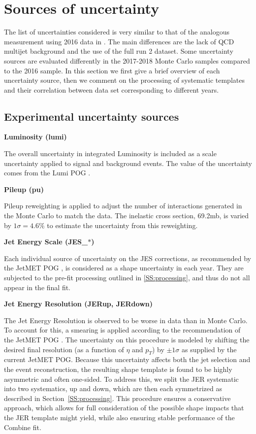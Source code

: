 \clearpage
\section{Sources of uncertainty}

The list of uncertainties considered is very similar to that of the analogous measurement using 2016 data in \cite{ytnote}. The main differences are the lack of QCD multijet background and the  use of the full run 2 dataset. Some uncertainty sources are evaluated differently in the 2017-2018 Monte Carlo samples compared to the 2016 sample. In this section we first give a brief overview of each uncertainty source, then we comment on the processing of systematic templates and their correlation between data set corresponding to different years.

\label{S:sys}
\subsection{Experimental uncertainty sources}
\label{SS:syslist}

\noindent \textbf{Luminosity (lumi)}

The overall uncertainty in integrated Luminosity is included as a scale uncertainty applied to signal and background events. The value of the uncertainty comes from the Lumi POG \cite{LumiTwiki}.

\par \noindent
\textbf{Pileup (pu)}

Pileup reweighting is applied to adjust the number of interactions generated in the Monte Carlo to match the data. The inelastic cross section, 69.2\unit{mb}, is varied by $1\sigma = 4.6\%$ to estimate the uncertainty from this reweighting.

\par \noindent
\textbf{Jet Energy Scale (JES\_$\ast$)}

Each individual source of uncertainty on the JES corrections, as recommended by the JetMET POG \cite{JECtwiki}, is considered as a shape uncertainty in each year. They are subjected to the pre-fit processing outlined in \ref{SS:processing}, and thus do not all appear in the final fit.

\par \noindent
\textbf{Jet Energy Resolution (JERup, JERdown)}

The Jet Energy Resolution is observed to be worse in data than in Monte Carlo. To account for this, a smearing is applied according to the recommendation of the JetMET POG \cite{JERtwiki}. The uncertainty on this procedure is modeled by shifting the desired final resolution (as a function of $\eta$ and $p_T$) by $\pm 1\sigma$ as supplied by the current JetMET POG.
Because this uncertainty affects both the jet selection and the event reconstruction, the resulting shape template is found to be highly asymmetric and often one-sided. To address this, we split the JER systematic into two systematics, up and down, which are then each symmetrized as described in Section~\ref{SS:processing}. This procedure ensures a conservative approach, which allows for full consideration of the possible shape impacts that the JER template might yield, while also ensuring stable performance of the Combine fit.

